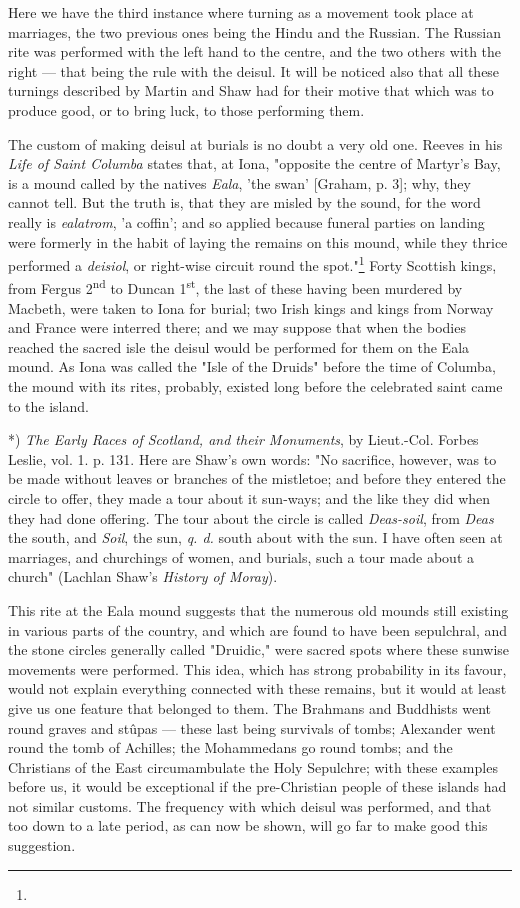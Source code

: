 \documentclass[a4paper, 11pt, oneside, polutonikogreek, english]{article}
\begin{document}
Here we have the third instance where turning as a movement took place at marriages, the two previous ones being the Hindu and the Russian. The Russian rite was performed with the left hand to the centre, and the two others with the right --- that being the rule with the deisul. It will be noticed also that all these turnings described by Martin and Shaw had for their motive that which was to produce good, or to bring luck, to those performing them.

The custom of making deisul at burials is no doubt a very old one. Reeves in his \emph{Life of Saint Columba} states that, at Iona, "opposite the centre of Martyr's Bay, is a mound called by the natives \emph{Eala}, 'the swan' [Graham, p. 3]; why, they cannot tell. But the truth is, that they are misled by the sound, for the word really is \emph{ealatrom}, 'a coffin'; and so applied because funeral parties on landing were formerly in the habit of laying the remains on this mound, while they thrice performed a \emph{deisiol}, or right-wise circuit round the spot."\footnote{} Forty Scottish kings, from Fergus 2\textsuperscript{nd} to Duncan 1\textsuperscript{st}, the last of these having been murdered by Macbeth, were taken to Iona for burial; two Irish kings and kings from Norway and France were interred there; and we may suppose that when the bodies reached the sacred isle the deisul would be performed for them on the Eala mound. As Iona was called the "Isle of the Druids" before the time of Columba, the mound with its rites, probably, existed long before the celebrated saint came to the island.

*) \emph{The Early Races of Scotland, and their Monuments}, by Lieut.-Col. Forbes Leslie, vol. 1. p. 131. Here are Shaw's own words: "No sacrifice, however, was to be made without leaves or branches of the mistletoe; and before they entered the circle to offer, they made a tour about it sun-ways; and the like they did when they had done offering. The tour about the circle is called \emph{Deas-soil}, from \emph{Deas} the south, and \emph{Soil}, the sun, \emph{q. d.} south about with the sun. I have often seen at marriages, and churchings of women, and burials, such a tour made about a church" (Lachlan Shaw's \emph{History of Moray}).

This rite at the Eala mound suggests that the numerous old mounds still existing in various parts of the country, and which are found to have been sepulchral, and the stone circles generally called "Druidic," were sacred spots where these sunwise movements were performed. This idea, which has strong probability in its favour, would not explain everything connected with these remains, but it would at least give us one feature that belonged to them. The Brahmans and Buddhists went round graves and stûpas --- these last being survivals of tombs; Alexander went round the tomb of Achilles; the Mohammedans go round tombs; and the Christians of the East circumambulate the Holy Sepulchre; with these examples before us, it would be exceptional if the pre-Christian people of these islands had not similar customs. The frequency with which deisul was performed, and that too down to a late period, as can now be shown, will go far to make good this suggestion.
\end{document}
